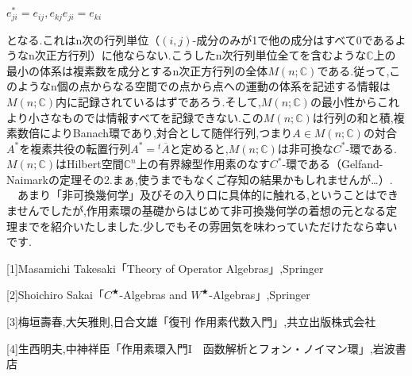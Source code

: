 \begin{center}
$e_{ji}^*=e_{ij},　e_{kj}e_{ji}=e_{ki}$
\end{center}
となる.これはn次の行列単位（$\left(i,j\right)$-成分のみが1で他の成分はすべて0であるようなn次正方行列）に他ならない.こうしたn次行列単位全てを含むような$\mathbb{C}$上の最小の体系は複素数を成分とするn次正方行列の全体$M\left(n;\mathbb{C}\right)$である.従って,このようなn個の点からなる空間での点から点への運動の体系を記述する情報は$M\left(n;\mathbb{C}\right)$内に記録されているはずであろう.そして,$M\left(n;\mathbb{C}\right)$の最小性からこれより小さなものでは情報すべてを記録できない.この$M\left(n;\mathbb{C}\right)$は行列の和と積,複素数倍によりBanach環であり,対合として随伴行列,つまり$A\in M\left(n;\mathbb{C}\right)$の対合$A^*$を複素共役の転置行列$A^*={}^{t}\overline{A}$と定めると,$M\left(n;\mathbb{C}\right)$は非可換な$C^*$-環である.$M\left(n;\mathbb{C}\right)$はHilbert空間$\mathbb{C}^n$上の有界線型作用素のなす$C^*$-環である（Gelfand-Naimarkの定理その2.まぁ,使うまでもなくご存知の結果かもしれませんが…）.
　あまり「非可換幾何学」及びその入り口に具体的に触れる,ということはできませんでしたが,作用素環の基礎からはじめて非可換幾何学の着想の元となる定理までを紹介いたしました.少しでもその雰囲気を味わっていただけたなら幸いです.

\begin{description}
\item{[1]}Masamichi Takesaki「Theory of Operator Algebras」,Springer
\item{[2]}Shoichiro Sakai「$C^★$-Algebras and $W^★$-Algebras」,Springer
\item{[3]}梅垣壽春,大矢雅則,日合文雄「復刊 作用素代数入門」,共立出版株式会社
\item{[4]}生西明夫,中神祥臣「作用素環入門I　函数解析とフォン・ノイマン環」,岩波書店
\end{description}
